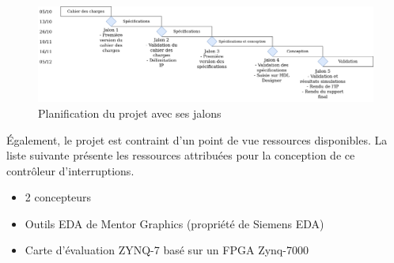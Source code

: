 \begin{figure}[H]
	\centering
	\includegraphics[width=1\linewidth]{figure/planning.png}
	\caption{Planification du projet avec ses jalons}
	\label{fig:planning}
\end{figure}

Également, le projet est contraint d'un point de vue ressources disponibles.
La liste suivante présente les ressources attribuées pour la conception de ce contrôleur d'interruptions.

\begin{itemize}
	\item 2 concepteurs
	\item Outils EDA de Mentor Graphics (propriété de Siemens EDA)
	\item Carte d'évaluation ZYNQ-7 basé sur un FPGA Zynq-7000
\end{itemize}
